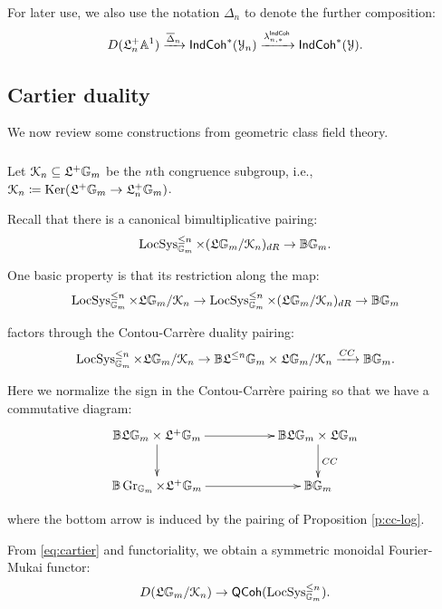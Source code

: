 \documentclass[reqno,11pt]{amsart}
\numberwithin{equation}{subsection}
\theoremstyle{remark}
\newcommand{\xar}[1]{\xrightarrow{#1}}
\newcommand{\bA}{{\mathbb A}}
\newcommand{\bB}{{\mathbb B}}
\newcommand{\bG}{{\mathbb G}}
\newcommand{\sK}{{\EuScript K}}
\newcommand{\sY}{{\EuScript Y}}
\newcommand{\fL}{{\mathfrak L}}
\newcommand{\on}{\operatorname}
\newcommand{\ol}[1]{\overline{#1}{}}
\newcommand{\Ker}{\on{Ker}}
\newcommand{\Gr}{\on{Gr}}
\newcommand{\LocSys}{\on{LocSys}}
\newcommand{\IndCoh}{\mathsf{IndCoh}}
\newcommand{\QCoh}{\mathsf{QCoh}}
\renewcommand{\subset}{\subseteq}
\begin{document}
\subsubsection{}\label{sss:delta-n}

For later use, we also use the notation 
$\Delta_n$ to denote the further composition:
%
\[
D(\fL_n^+\bA^1) \xar{\ol{\Delta}_n} \IndCoh^*(\sY_n) 
\xar{\lambda_{n,*}^{\IndCoh}} \IndCoh^*(\sY).
\]

\subsection{Cartier duality}

We now review some constructions from geometric class field theory.

\subsubsection{}

Let $\sK_n \subset \fL^+ \bG_m$ be the $n$th congruence subgroup, 
i.e., $\sK_n \coloneqq \Ker(\fL^+\bG_m \to \fL_n^+\bG_m)$.

Recall that there is a canonical bimultiplicative pairing:
%
\begin{equation}\label{eq:cartier}
\LocSys_{\bG_m}^{\leq n} \times (\fL\bG_m/\sK_n)_{dR} \to \bB \bG_m.
\end{equation}

\noindent One basic property is that its restriction along the map:
%
\[
\LocSys_{\bG_m}^{\leq n} \times \fL\bG_m/\sK_n
\to 
\LocSys_{\bG_m}^{\leq n} \times (\fL\bG_m/\sK_n)_{dR} \to \bB \bG_m
\]

\noindent factors through the Contou-Carr\`ere duality pairing:
%
\[
\LocSys_{\bG_m}^{\leq n} \times \fL\bG_m/\sK_n \to 
\bB \fL^{\leq n} \bG_m \times \fL\bG_m/\sK_n \xar{CC} 
\bB \bG_m.
\]

\noindent Here we normalize the sign in the Contou-Carr\`ere pairing
so that we have a commutative diagram:
%
\[
\xymatrix{
\bB \fL \bG_m \times \fL^+\bG_m \ar[rr] \ar[d] & & 
\bB \fL \bG_m \times \fL\bG_m \ar[d]^{CC} \\
\bB \Gr_{\bG_m} \times \fL^+\bG_m \ar[rr] & &
\bB \bG_m
}
\]

\noindent where the bottom arrow is induced by the pairing of 
Proposition \ref{p:cc-log}.

From \eqref{eq:cartier} and functoriality, we obtain a symmetric
monoidal Fourier-Mukai functor:
%
\begin{equation}\label{eq:trun-lcft}
D(\fL\bG_m/\sK_n) \to \QCoh(\LocSys_{\bG_m}^{\leq n}).
\end{equation}
\end{document}
